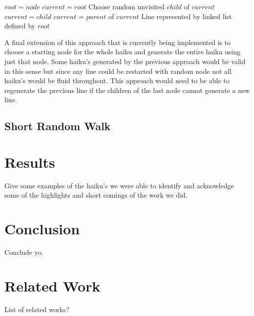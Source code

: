 \documentclass[]{article}
\begin{document}
\begin{algorithm}[H]
	\caption{$Depth\_First\_Search(node, n)$} \label{DFSB_WithStart}
	\begin{algorithmic}[1]
		\State $root = node$
		\State $current = root$
		\State Choose random unvisited $child$ of $current$
		\State $current = child$
		\EndIf
		\Else
		\Else
		\State $current$ = $parent$ of $current$
		\EndIf
		\EndIf
		\EndWhile
		\Return Line represented by linked list defined by $root$
	\end{algorithmic}
\end{algorithm}

A final extension of this approach that is currently being implemented is to choose a starting node for the whole haiku and generate the entire haiku using just that node. Some haiku's generated by the previous approach would be valid in this sense but since any line could be restarted with random node not all haiku's would be fluid throughout. This approach would need to be able to regenerate the previous line if the children of the last node cannot generate a new line.


\subsection{Short Random Walk}

\section{Results}
Give some examples of the haiku's we were able to identify and acknowledge some of the highlights and short comings of the work we did.

\section{Conclusion}
Conclude yo.

\section{Related Work}
List of related works?



\end{document}
